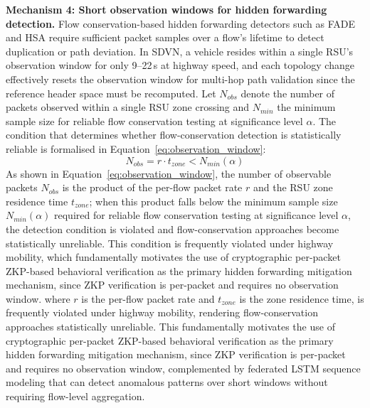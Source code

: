 \documentclass[12pt, a4paper]{report}
\begin{document}
\textbf{Mechanism 4: Short observation windows for hidden forwarding
detection.}
Flow conservation-based hidden forwarding detectors such as FADE and
HSA require sufficient packet samples over a flow's lifetime to detect
duplication or path deviation. In SDVN, a vehicle resides within a
single RSU's observation window for only 9--22\,s at highway speed,
and each topology change effectively resets the observation window
for multi-hop path validation since the reference header space must
be recomputed. Let $N_{obs}$ denote the number of packets observed
within a single RSU zone crossing and $N_{min}$ the minimum sample
size for reliable flow conservation testing at significance level
$\alpha$. The condition that determines whether flow-conservation
detection is statistically reliable is formalised in
Equation~\eqref{eq:observation_window}:
\begin{equation}
N_{obs} = r \cdot t_{zone} < N_{min}(\alpha)
\label{eq:observation_window}
\end{equation}
As shown in Equation~\eqref{eq:observation_window}, the number
of observable packets $N_{obs}$ is the product of the per-flow packet
rate $r$ and the RSU zone residence time $t_{zone}$; when this
product falls below the minimum sample size $N_{min}(\alpha)$ required
for reliable flow conservation testing at significance level $\alpha$,
the detection condition is violated and flow-conservation approaches
become statistically unreliable. This condition is frequently violated
under highway mobility, which fundamentally motivates the use of
cryptographic per-packet ZKP-based behavioral verification as the
primary hidden forwarding mitigation mechanism, since ZKP verification
is per-packet and requires no observation window.
where $r$ is the per-flow packet rate and $t_{zone}$ is the zone
residence time, is frequently violated under highway mobility,
rendering flow-conservation approaches statistically unreliable.
This fundamentally motivates the use of cryptographic per-packet
ZKP-based behavioral verification as the primary hidden forwarding
mitigation mechanism, since ZKP verification is per-packet and
requires no observation window, complemented by federated LSTM
sequence modeling that can detect anomalous patterns over short
windows without requiring flow-level aggregation.



\clearpage
\end{document}
